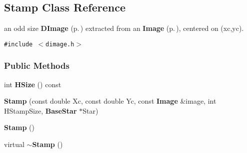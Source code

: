 \subsection{Stamp  Class Reference}
\label{class_stamp}
an odd size {\bf DImage} {\rm (p.\,\pageref{class_dimage})} extracted from an {\bf Image} {\rm (p.\,\pageref{class_image})}, centered on (xc,yc). 


{\tt \#include $<$dimage.h$>$}

\subsubsection*{Public Methods}
\begin{CompactItemize}
\item 
{}
int {\bf HSize} () const\label{class_stamp_a0}

\item 
{}
{\bf Stamp} (const double Xc, const double Yc, const {\bf Image} \&image, int HStamp\-Size, {\bf Base\-Star} $\ast$Star)\label{class_stamp_a1}

\item 
{}
{\bf Stamp} ()\label{class_stamp_a2}

\item 
{}
virtual {\bf $\sim$Stamp} ()\label{class_stamp_a3}

\end{CompactItemize}
